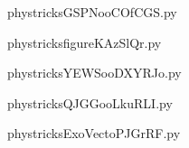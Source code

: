     

    \clearpage
    


    \newcommand{\CaptionFigGSPNooCOfCGS}{<+Type your caption here+>}
    \begin{center}
        
    \end{center}
    phystricksGSPNooCOfCGS.py

    

    \clearpage
    


    \newcommand{\CaptionFigfigureKAzSlQr}{<+Type your caption here+>}
    \begin{center}
        
    \end{center}
    phystricksfigureKAzSlQr.py

    

    \clearpage
    


    \newcommand{\CaptionFigYEWSooDXYRJo}{<+Type your caption here+>}
    \begin{center}
        
    \end{center}
    phystricksYEWSooDXYRJo.py

    

    \clearpage
    


    \newcommand{\CaptionFigQJGGooLkuRLI}{<+Type your caption here+>}
    \begin{center}
        
    \end{center}
    phystricksQJGGooLkuRLI.py

    

    \clearpage
    


    \newcommand{\CaptionFigExoVectoPJGrRF}{<+Type your caption here+>}
    \begin{center}
        
    \end{center}
    phystricksExoVectoPJGrRF.py

    

    \clearpage
    


